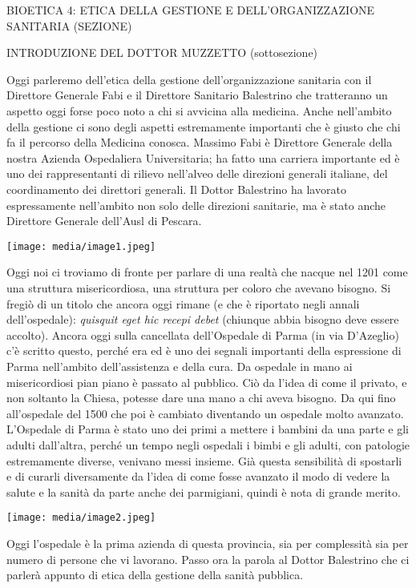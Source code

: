 \documentclass[]{article}
\date{}
\begin{document}
BIOETICA 4: ETICA DELLA GESTIONE E DELL'ORGANIZZAZIONE SANITARIA
(SEZIONE)

INTRODUZIONE DEL DOTTOR MUZZETTO (sottosezione)

Oggi parleremo dell'etica della gestione dell'organizzazione sanitaria
con il Direttore Generale Fabi e il Direttore Sanitario Balestrino che
tratteranno un aspetto oggi forse poco noto a chi si avvicina alla
medicina. Anche nell'ambito della gestione ci sono degli aspetti
estremamente importanti che è giusto che chi fa il percorso della
Medicina conosca. Massimo Fabi è Direttore Generale della nostra Azienda
Ospedaliera Universitaria; ha fatto una carriera importante ed è uno dei
rappresentanti di rilievo nell'alveo delle direzioni generali italiane,
del coordinamento dei direttori generali. Il Dottor Balestrino ha
lavorato espressamente nell'ambito non solo delle direzioni sanitarie,
ma è stato anche Direttore Generale dell'Ausl di Pescara.

\texttt{[image: media/image1.jpeg]}

Oggi noi ci troviamo di fronte per parlare di una realtà che nacque nel
1201 come una struttura misericordiosa, una struttura per coloro che
avevano bisogno. Si fregiò di un titolo che ancora oggi rimane (e che è
riportato negli annali dell'ospedale): \emph{quisquit eget hic recepi
debet} (chiunque abbia bisogno deve essere accolto). Ancora oggi sulla
cancellata dell'Ospedale di Parma (in via D'Azeglio) c'è scritto questo,
perché era ed è uno dei segnali importanti della espressione di Parma
nell'ambito dell'assistenza e della cura. Da ospedale in mano ai
misericordiosi pian piano è passato al pubblico. Ciò da l'idea di come
il privato, e non soltanto la Chiesa, potesse dare una mano a chi aveva
bisogno. Da qui fino all'ospedale del 1500 che poi è cambiato diventando
un ospedale molto avanzato. L'Ospedale di Parma è stato uno dei primi a
mettere i bambini da una parte e gli adulti dall'altra, perché un tempo
negli ospedali i bimbi e gli adulti, con patologie estremamente diverse,
venivano messi insieme. Già questa sensibilità di spostarli e di curarli
diversamente da l'idea di come fosse avanzato il modo di vedere la
salute e la sanità da parte anche dei parmigiani, quindi è nota di
grande merito.

\texttt{[image: media/image2.jpeg]}

Oggi l'ospedale è la prima azienda di questa provincia, sia per
complessità sia per numero di persone che vi lavorano. Passo ora la
parola al Dottor Balestrino che ci parlerà appunto di etica della
gestione della sanità pubblica.
\end{document}
